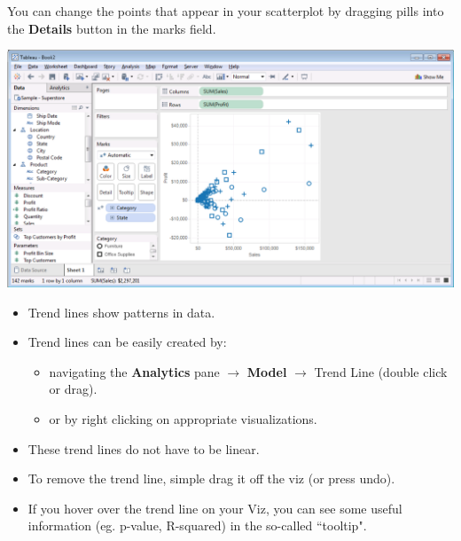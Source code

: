 \documentclass[xcolor=svgnames]{beamer} %
\begin{document}
\begin{frame}
You can change the points that appear in your scatterplot by dragging pills into the {\bf Details} button in the marks field.
\begin{center}
\includegraphics[width=.9\textwidth]{img/scatter}
\end{center}
\end{frame}








\begin{frame}
\begin{itemize}
\item Trend lines show patterns in data.\vfill

\item Trend lines can be easily created by:
\begin{itemize}
\item  navigating the {\bf Analytics} pane $\to$ {\bf Model} $\to$ Trend Line (double click or drag).
\item or by right clicking on appropriate visualizations.\vfill
\end{itemize}
\item These trend lines do not have to be linear.\vfill
\item To remove the trend line, simple drag it off the viz (or press undo).
\item If you hover over the trend line on your Viz, you can see some useful information (eg. p-value, R-squared) in the so-called ``tooltip".
\end{itemize}
\end{frame}
\end{document}
